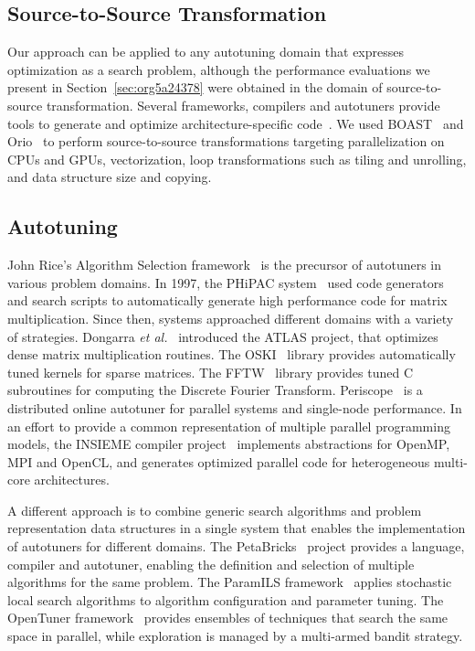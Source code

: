 \documentclass[conference]{IEEEtran}
\begin{document}
\subsection{Source-to-Source Transformation}
\label{sec:orgaf50e5e}
Our approach can be applied to any autotuning domain that expresses optimization
as a search problem, although the performance evaluations we present in
Section~\ref{sec:org5a24378} were obtained in the domain of
source-to-source transformation. Several frameworks, compilers and autotuners
provide tools to generate and optimize architecture-specific
code~\cite{hartono2009annotation,videau2017boast,tiwari2009scalable,yi2007poet,ansel2009petabricks}.
We used BOAST~\cite{videau2017boast} and
Orio~\cite{hartono2009annotation} to perform source-to-source
transformations targeting parallelization on CPUs and GPUs, vectorization, loop
transformations such as tiling and unrolling, and data structure size and
copying.
\subsection{Autotuning}
\label{sec:org7fb14fa}
John Rice's Algorithm Selection framework~\cite{rice1976algorithm} is the
precursor of autotuners in various problem domains. In 1997, the PHiPAC
system~\cite{bilmes1997optimizing} used code generators and search scripts
to automatically generate high performance code for matrix multiplication. Since
then, systems approached different domains with a variety of strategies.
Dongarra \emph{et al.}~\cite{dongarra1998automatically} introduced the ATLAS
project, that optimizes dense matrix multiplication routines. The
OSKI~\cite{vuduc2005oski} library provides automatically tuned kernels for
sparse matrices. The FFTW~\cite{frigo1998fftw} library provides tuned C
subroutines for computing the Discrete Fourier Transform.
Periscope~\cite{gerndt2010automatic} is a distributed online autotuner for
parallel systems and single-node performance. In an effort to provide a common
representation of multiple parallel programming models, the INSIEME compiler
project~\cite{jordan2012multi} implements abstractions for OpenMP, MPI and
OpenCL, and generates optimized parallel code for heterogeneous multi-core
architectures.

A different approach is to combine generic search algorithms and problem
representation data structures in a single system that enables the
implementation of autotuners for different domains. The
PetaBricks~\cite{ansel2009petabricks} project provides a language,
compiler and autotuner, enabling the definition and selection of multiple
algorithms for the same problem. The ParamILS
framework~\cite{hutter2009paramils} applies stochastic local search
algorithms to algorithm configuration and parameter tuning. The OpenTuner
framework~\cite{ansel2014opentuner} provides ensembles of techniques that
search the same space in parallel, while exploration is managed by a multi-armed
bandit strategy.
\end{document}
